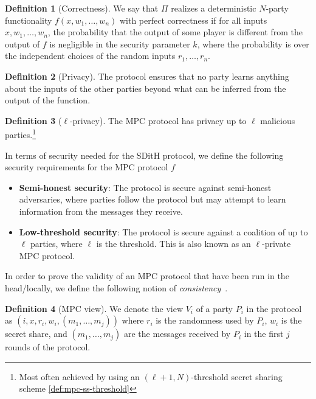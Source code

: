 \documentclass[11pt]{report}
\theoremstyle{definition}
\newtheorem{definition}{Definition}[section]
\theoremstyle{plain}
\begin{document}
\begin{definition}[Correctness]\label{def:mpc-correctness}
  We say that $\Pi$ realizes a deterministic $N$-party functionality $f(x, w_1, \dots, w_n)$ with perfect correctness if for all inputs $x, w_1, \dots, w_n$, the probability that the output of some player is different from the output of $f$ is negligible in the security parameter $k$, where the probability is over the independent choices of the random inputs $r_1, \dots, r_n$.
\end{definition}

\begin{definition}[Privacy]\label{def:mpc-privacy}
  The protocol ensures that no party learns anything about the inputs of the other parties beyond what can be inferred from the output of the function.
\end{definition}

\begin{definition}[$\ell$-privacy]\label{def:mpc-ell-privacy}
  The MPC protocol has privacy up to $\ell$ malicious parties.\footnote{Most often achieved by using an $(\ell + 1, N)$-threshold secret sharing scheme \autoref{def:mpc-ss-threshold}}
\end{definition}

In terms of security needed for the SDitH protocol, we define the following security requirements for the MPC protocol $f$

\begin{itemize}
  \item \textbf{Semi-honest security}: The protocol is secure against semi-honest adversaries, where parties follow the protocol but may attempt to learn information from the messages they receive.
  \item \textbf{Low-threshold security}: The protocol is secure against a coalition of up to $\ell$ parties, where $\ell$ is the threshold. This is also known as an $\ell$-private MPC protocol.
\end{itemize}

In order to prove the validity of an MPC protocol that have been run in the head/locally, we define the following notion of \textit{consistency}~\cite{ishai2007zero}.

\begin{definition}[MPC view]\label{def:mpc-view}
  We denote the view $V_i$ of a party $P_i$ in the protocol as $(i, x, r_i, w_i, (m_1, \dots, m_j))$ where $r_i$ is the randomness used by $P_i$, $w_i$ is the secret share, and $(m_1, \dots, m_j)$ are the messages received by $P_i$ in the first $j$ rounds of the protocol.
\end{definition}
\end{document}
